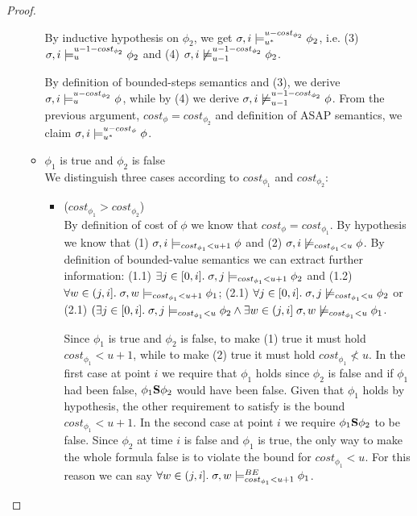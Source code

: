 \begin{theorem}
\begin{proof}
\begin{itemize}
\begin{itemize}
        By inductive hypothesis on $\phi_2$, we get $\sigma,i \models_{{u}^*}^{u-cost_{\phi_2}} \phi_2$, i.e. (3) $\sigma,i \models_{u}^{u-1-cost_{\phi_2}} \phi_2$ and (4) $\sigma,i \not\models_{u-1}^{u-1-cost_{\phi_2}} \phi_2$.
        
        By definition of bounded-steps semantics and (3), we derive $\sigma,i \models_{u}^{u-cost_{\phi_2}} \phi$, while by (4) we derive $\sigma,i \not\models_{u-1}^{u-1-cost_{\phi_2}} \phi$.
        From the previous argument, $cost_\phi = cost_{\phi_2}$ and definition of ASAP semantics, we claim $\sigma,i \models_{{u}^*}^{u-cost_\phi} \phi$. 
        
        \item $\phi_1$ is true and $\phi_2$ is false \\
        We distinguish three cases according to $cost_{\phi_1}$ and $cost_{\phi_2}$:
        \begin{itemize}
            \item ($cost_{\phi_1} > cost_{\phi_2}$) \\
            By definition of cost of $\phi$ we know that $cost_\phi = cost_{\phi_1}$.
            By hypothesis we know that 
            (1) $\sigma, i \models_{cost_{\phi_1} < u + 1} \phi$ and 
            (2) $\sigma, i \not\models_{cost_{\phi_1} < u} \phi$.
            By definition of bounded-value semantics we can extract further information:
            (1.1) $\exists j \in [0,i].\; \sigma,j \models_{cost_{\phi_1} < u + 1} \phi_2$ and 
            (1.2) $\forall w \in (j,i].\; \sigma,w \models_{cost_{\phi_1} < u + 1} \phi_1$;
            (2.1) $\forall j \in [0,i].\; \sigma,j \not\models_{cost_{\phi_1} < u} \phi_2$ or
            (2.1) $(\exists j \in [0,i].\; \sigma,j \models_{cost_{\phi_1} < u} \phi_2 \land \exists w \in (j,i]\; \sigma,w \not\models_{cost_{\phi_1} < u} \phi_1$.

            Since $\phi_1$ is true and $\phi_2$ is false, to make (1) true it must hold $cost_{\phi_1} < u + 1$, while to make (2) true it must hold $cost_{\phi_1} \not< u$.
            In the first case at point $i$ we require that $\phi_1$ holds since $\phi_2$ is false and if $\phi_1$ had been false, $\phi_1 \mathbf{S} \phi_2$ would have been false. 
            Given that $\phi_1$ holds by hypothesis, the other requirement to satisfy is the bound $cost_{\phi_1} < u + 1$.
            In the second case at point $i$ we require $\phi_1 \mathbf{S} \phi_2$ to be false. Since $\phi_2$ at time $i$ is false and $\phi_1$ is true, the only way to make the whole formula false is to violate the bound for $cost_{\phi_1} < u$.
            For this reason we can say $\forall w \in (j,i].\; \sigma,w \models_{cost_{\phi_1} < u + 1}^{BE} \phi_1$.
            

\end{itemize}
\end{itemize}
\end{itemize}
\end{proof}
\end{theorem}

